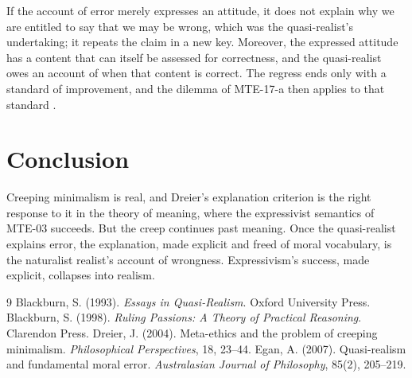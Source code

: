 \documentclass{situationist-preprint}
\begin{document}
\begin{reply}
If the account of error merely expresses an attitude, it does not explain why we are entitled to say that we may be wrong, which was the quasi-realist's undertaking; it repeats the claim in a new key. Moreover, the expressed attitude has a content that can itself be assessed for correctness, and the quasi-realist owes an account of when that content is correct. The regress ends only with a standard of improvement, and the dilemma of MTE-17-a then applies to that standard \citep{Egan2007}.
\end{reply}

\section{Conclusion}

Creeping minimalism is real, and Dreier's explanation criterion is the right response to it in the theory of meaning, where the expressivist semantics of MTE-03 succeeds. But the creep continues past meaning. Once the quasi-realist explains error, the explanation, made explicit and freed of moral vocabulary, is the naturalist realist's account of wrongness. Expressivism's success, made explicit, collapses into realism.

\begin{thebibliography}{9}\small
{} Blackburn, S. (1993). \emph{Essays in Quasi-Realism}. Oxford University Press.
 Blackburn, S. (1998). \emph{Ruling Passions: A Theory of Practical Reasoning}. Clarendon Press.
 Dreier, J. (2004). Meta-ethics and the problem of creeping minimalism. \emph{Philosophical Perspectives}, 18, 23--44.
 Egan, A. (2007). Quasi-realism and fundamental moral error. \emph{Australasian Journal of Philosophy}, 85(2), 205--219.
\end{thebibliography}
\end{document}
